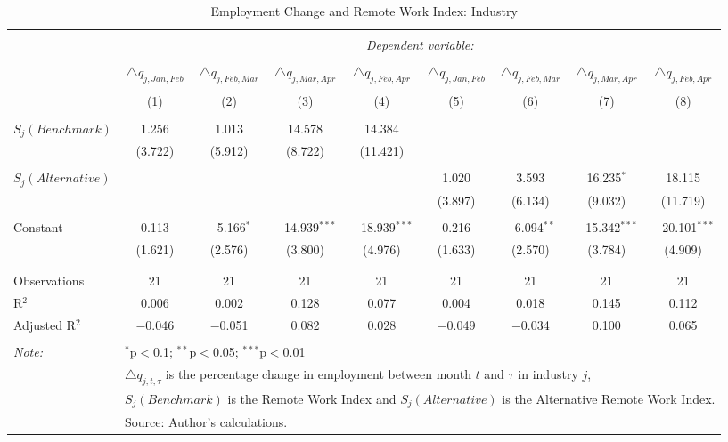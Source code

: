 
\begin{table}[!htbp] \centering 
  \caption{Employment Change and Remote Work Index: Industry} 
  \label{tab:regression_dynamics_industry} 
\footnotesize 
\begin{tabular}{@{\extracolsep{5pt}}lcccccccc} 
\\[-1.8ex]\hline 
\hline \\[-1.8ex] 
 & \multicolumn{8}{c}{\textit{Dependent variable:}} \\ 
\cline{2-9} 
\\[-1.8ex] & $\triangle q_{j,Jan,Feb}$ & $\triangle q_{j,Feb,Mar}$ & $\triangle q_{j,Mar,Apr}$ & $\triangle q_{j,Feb,Apr}$ & $\triangle q_{j,Jan,Feb}$ & $\triangle q_{j,Feb,Mar}$ & $\triangle q_{j,Mar,Apr}$ & $\triangle q_{j,Feb,Apr}$ \\ 
\\[-1.8ex] & (1) & (2) & (3) & (4) & (5) & (6) & (7) & (8)\\ 
\hline \\[-1.8ex] 
 $S_{j}(Benchmark)$ & 1.256 & 1.013 & 14.578 & 14.384 &  &  &  &  \\ 
  & (3.722) & (5.912) & (8.722) & (11.421) &  &  &  &  \\ 
  & & & & & & & & \\ 
 $S_{j}(Alternative)$ &  &  &  &  & 1.020 & 3.593 & 16.235$^{*}$ & 18.115 \\ 
  &  &  &  &  & (3.897) & (6.134) & (9.032) & (11.719) \\ 
  & & & & & & & & \\ 
 Constant & 0.113 & $-$5.166$^{*}$ & $-$14.939$^{***}$ & $-$18.939$^{***}$ & 0.216 & $-$6.094$^{**}$ & $-$15.342$^{***}$ & $-$20.101$^{***}$ \\ 
  & (1.621) & (2.576) & (3.800) & (4.976) & (1.633) & (2.570) & (3.784) & (4.909) \\ 
  & & & & & & & & \\ 
\hline \\[-1.8ex] 
Observations & 21 & 21 & 21 & 21 & 21 & 21 & 21 & 21 \\ 
R$^{2}$ & 0.006 & 0.002 & 0.128 & 0.077 & 0.004 & 0.018 & 0.145 & 0.112 \\ 
Adjusted R$^{2}$ & $-$0.046 & $-$0.051 & 0.082 & 0.028 & $-$0.049 & $-$0.034 & 0.100 & 0.065 \\ 
\hline 
\hline \\[-1.8ex] 
\textit{Note:}  & \multicolumn{8}{l}{$^{*}$p$<$0.1; $^{**}$p$<$0.05; $^{***}$p$<$0.01} \\ 
 & \multicolumn{8}{l}{$\triangle q_{j,t,\tau}$ is the percentage change in employment between month $t$ and $\tau$ in industry $j$,} \\ 
 & \multicolumn{8}{l}{$S_{j} (Benchmark)$ is the Remote Work Index and $S_{j} (Alternative)$ is the Alternative Remote Work Index.} \\ 
 & \multicolumn{8}{l}{Source: Author's calculations.} \\ 
\end{tabular} 
\end{table} 
